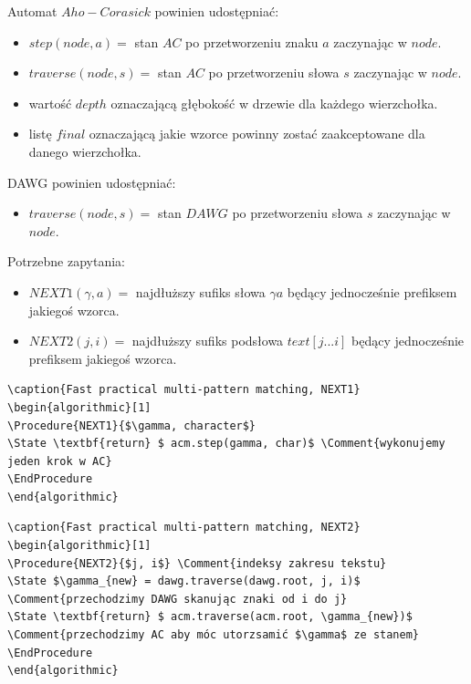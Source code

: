 \begin{definition}{}{}
Automat $Aho-Corasick$  powinien udostępniać:
\begin{itemize}
    \item $step(node, a) = $ stan $AC$ po przetworzeniu znaku $a$ zaczynając w $node$.
    \item $traverse(node, s) = $ stan $AC$ po przetworzeniu słowa $s$ zaczynając w $node$.
    \item wartość $depth$ oznaczającą głębokość w drzewie dla każdego wierzchołka.
    \item listę $final$ oznaczającą jakie wzorce powinny zostać zaakceptowane dla danego wierzchołka.

\end{itemize}
\end{definition}

\begin{definition}{}{}
DAWG powinien udostępniać:
\begin{itemize}
    \item $traverse(node, s) = $ stan $DAWG$ po przetworzeniu słowa $s$ zaczynając w $node$.
\end{itemize}
\end{definition}

\begin{definition}{}{}
Potrzebne zapytania:
\begin{itemize}
    \item $NEXT1(\gamma, a) = $ najdłuższy sufiks słowa ${\gamma}{a}$ będący jednocześnie prefiksem jakiegoś wzorca.
    \item $NEXT2(j, i) = $ najdłuższy sufiks podsłowa ${text[j...i]}$ będący jednocześnie prefiksem jakiegoś wzorca.
\end{itemize}
\end{definition}

\begin{verbatim}
\caption{Fast practical multi-pattern matching, NEXT1}
\begin{algorithmic}[1]
\Procedure{NEXT1}{$\gamma, character$}
\State \textbf{return} $ acm.step(gamma, char)$ \Comment{wykonujemy jeden krok w AC}
\EndProcedure
\end{algorithmic}
\end{verbatim}

\begin{verbatim}
\caption{Fast practical multi-pattern matching, NEXT2}
\begin{algorithmic}[1]
\Procedure{NEXT2}{$j, i$} \Comment{indeksy zakresu tekstu}
\State $\gamma_{new} = dawg.traverse(dawg.root, j, i)$ \Comment{przechodzimy DAWG skanując znaki od i do j}
\State \textbf{return} $ acm.traverse(acm.root, \gamma_{new})$ \Comment{przechodzimy AC aby móc utorzsamić $\gamma$ ze stanem}
\EndProcedure
\end{algorithmic}
\end{verbatim}

